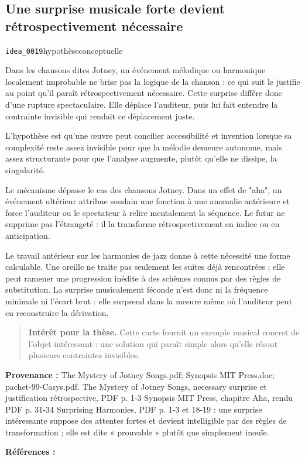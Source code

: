 \documentclass[10pt,a4paper]{article}
\begin{document}
\subsection{Une surprise musicale forte devient rétrospectivement nécessaire}
{\small\color{metadata} \texttt{idea\_0019}\quad\textbullet\quad hypothèse\quad\textbullet\quad conceptuelle\par}

Dans les chansons dites Jotney, un événement mélodique ou harmonique localement improbable ne brise pas la logique de la chanson : ce qui suit le justifie au point qu'il paraît rétrospectivement nécessaire. Cette surprise diffère donc d'une rupture spectaculaire. Elle déplace l'auditeur, puis lui fait entendre la contrainte invisible qui rendait ce déplacement juste.

L'hypothèse est qu'une œuvre peut concilier accessibilité et invention lorsque sa complexité reste assez invisible pour que la mélodie demeure autonome, mais assez structurante pour que l'analyse augmente, plutôt qu'elle ne dissipe, la singularité.

Le mécanisme dépasse le cas des chansons Jotney. Dans un effet de "aha", un événement ultérieur attribue soudain une fonction à une anomalie antérieure et force l'auditeur ou le spectateur à relire mentalement la séquence. Le futur ne supprime pas l'étrangeté : il la transforme rétrospectivement en indice ou en anticipation.

Le travail antérieur sur les harmonies de jazz donne à cette nécessité une forme calculable. Une oreille ne traite pas seulement les suites déjà rencontrées ; elle peut ramener une progression inédite à des schèmes connus par des règles de substitution. La surprise musicalement féconde n'est donc ni la fréquence minimale ni l'écart brut : elle surprend dans la mesure même où l'auditeur peut en reconstruire la dérivation.

\begin{quote}
\textbf{Intérêt pour la thèse.} Cette carte fournit un exemple musical concret de l'objet intéressant : une solution qui paraît simple alors qu'elle résout plusieurs contraintes invisibles.
\end{quote}
{\footnotesize\color{metadata}\textbf{Provenance :} The Mystery of Jotney Songs.pdf; Synopsis MIT Press.doc; pachet-99-Casys.pdf. The Mystery of Jotney Songs, necessary surprise et justification rétrospective, PDF p. 1-3 Synopsis MIT Press, chapitre Aha, rendu PDF p. 31-34 Surprising Harmonies, PDF p. 1-3 et 18-19 : une surprise intéressante suppose des attentes fortes et devient intelligible par des règles de transformation ; elle est dite « prouvable » plutôt que simplement inouïe.\par}
{\footnotesize\color{metadata}\textbf{Références :} \parencite{pachet1999surprising}\par}
\end{document}
